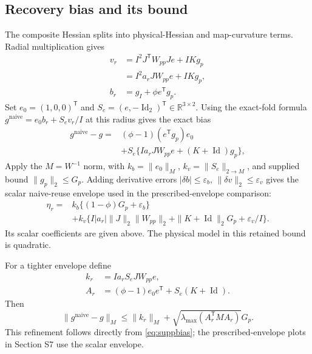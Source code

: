 \documentclass[10pt,a4paper]{article}
\begin{document}
\subsection{Recovery bias and its bound}
The composite Hessian splits into physical-Hessian and map-curvature terms. Radial multiplication gives
\begin{equation}
 \begin{aligned}
 v_r&=I^2J^{\mathsf T}W_{pp}Je+IKg_p\\
    &=I^2a_rJW_{pp}e+IKg_p,\\
 b_r&=g_I+\phi e^{\mathsf T}g_p.
 \end{aligned}
 \label{eq:suppnearhvp}
\end{equation}
Set $e_0=(1,0,0)^{\mathsf T}$ and $S_e=(e,-\operatorname{Id}_2)^{\mathsf T}\in\mathbb R^{3\times2}$. Using the exact-fold formula $g^{\mathrm{naive}}=e_0b_r+S_ev_r/I$ at this radius gives the exact bias
\begin{equation}
 \begin{aligned}
 g^{\mathrm{naive}}-g={}&(\phi-1)(e^{\mathsf T}g_p)e_0\\
 &+S_e\{Ia_rJW_{pp}e+(K+\operatorname{Id})g_p\},
 \end{aligned}
 \label{eq:suppbias}
\end{equation}
Apply the $M=W^{-1}$ norm, with $k_b=\|e_0\|_M$, $k_v=\|S_e\|_{2\to M}$, and supplied bound $\|g_p\|_2\leq G_p$. Adding derivative errors $|\delta b|\leq\varepsilon_b$, $\|\delta v\|_2\leq\varepsilon_v$ gives the scalar naive-reuse envelope used in the prescribed-envelope comparison:
\begin{equation}
 \begin{aligned}
 \eta_r={}&k_b\{(1-\phi)G_p+\varepsilon_b\}\\
 &+k_v\{I|a_r|\|J\|_2\|W_{pp}\|_2
       +\|K+\operatorname{Id}\|_2G_p+\varepsilon_v/I\}.
 \end{aligned}
 \label{eq:nearenvelope}
\end{equation}
Its scalar coefficients are given above. The physical model in this retained bound is quadratic.

For a tighter envelope define
\begin{equation}
 \begin{aligned}
 k_r&=Ia_rS_eJW_{pp}e,\\
 A_r&=(\phi-1)e_0e^{\mathsf T}+S_e(K+\operatorname{Id}).
 \end{aligned}
 \label{eq:suppoperator}
\end{equation}
Then
\begin{equation}
 \|g^{\mathrm{naive}}-g\|_M\leq
 \|k_r\|_M+\sqrt{\lambda_{\max}(A_r^{\mathsf T}MA_r)}G_p.
 \label{eq:supptightenvelope}
\end{equation}
This refinement follows directly from \eqref{eq:suppbias}; the prescribed-envelope plots in Section S7 use the scalar envelope.
\end{document}

